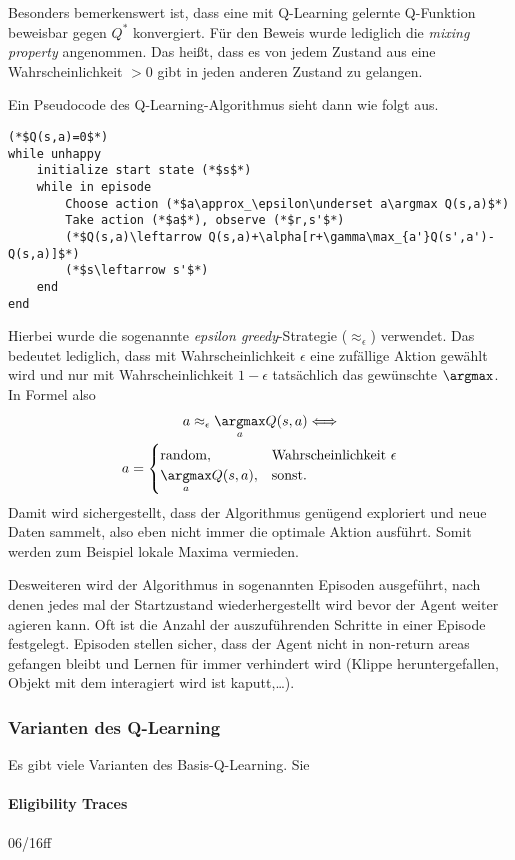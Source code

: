 \documentclass[ngerman]{../LaTeX-Templates/Paper/paper}
\begin{document}
Besonders bemerkenswert ist, dass eine mit Q-Learning gelernte Q-Funktion beweisbar gegen $Q^\ast$ konvergiert. Für den Beweis wurde lediglich die \emph{mixing property} angenommen. Das heißt, dass es von jedem Zustand aus eine Wahrscheinlichkeit $>0$ gibt in jeden anderen Zustand zu gelangen.

Ein Pseudocode des Q-Learning-Algorithmus sieht dann wie folgt aus.
\begin{lstlisting}
(*$Q(s,a)=0$*)
while unhappy
	initialize start state (*$s$*)
	while in episode
		Choose action (*$a\approx_\epsilon\underset a\argmax Q(s,a)$*)
		Take action (*$a$*), observe (*$r,s'$*)
		(*$Q(s,a)\leftarrow Q(s,a)+\alpha[r+\gamma\max_{a'}Q(s',a')-Q(s,a)]$*)
		(*$s\leftarrow s'$*)
	end
end\end{lstlisting}
Hierbei wurde die sogenannte \emph{epsilon greedy}-Strategie ($\approx_\epsilon$) verwendet. Das bedeutet lediglich, dass mit Wahrscheinlichkeit $\epsilon$ eine zufällige Aktion gewählt wird und nur mit Wahrscheinlichkeit $1-\epsilon$ tatsächlich das gewünschte $\argmax$. In Formel also
\begin{gather*}
	a\approx_\epsilon \underset a\argmax Q(s,a)\Longleftrightarrow\\ a=\begin{cases}
		\text{random},&\text{Wahrscheinlichkeit }\epsilon\\
		\underset a\argmax Q(s,a),&\text{sonst.}
	\end{cases}
\end{gather*}
Damit wird sichergestellt, dass der Algorithmus genügend exploriert und neue Daten sammelt, also eben nicht immer die optimale Aktion ausführt. Somit werden zum Beispiel lokale Maxima vermieden.

Desweiteren wird der Algorithmus in sogenannten Episoden ausgeführt, nach denen jedes mal der Startzustand wiederhergestellt wird bevor der Agent weiter agieren kann. Oft ist die Anzahl der auszuführenden Schritte in einer Episode festgelegt. Episoden stellen sicher, dass der Agent nicht in non-return areas gefangen bleibt und Lernen für immer verhindert wird (Klippe heruntergefallen, Objekt mit dem interagiert wird ist kaputt,\ldots).

\subsubsection{Varianten des Q-Learning}
Es gibt viele Varianten des Basis-Q-Learning. Sie
\paragraph{Eligibility Traces}
06/16ff
\end{document}
